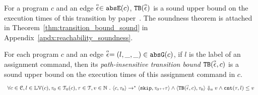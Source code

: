 \begin{enumerate}
For a program $c$ and an edge $\stackrel{\scriptscriptstyle{\alpha}}{\mathtt{\epsilon}{}} \in \mathtt{abs}{\mathtt{E}}(c)$,
${\mathtt{TB}}(\stackrel{\scriptscriptstyle{\alpha}}{\mathtt{\epsilon}{}})$ is a sound upper bound
on the execution times of this transition by paper~\cite{sinn2017complexity}.
The soundness theorem is attached in Theorem~\ref{thm:transition_bound_sound} in Appendix~\ref{apdx:reachability_soundness}.
%
\begin{thm}
  \label{thm:transition_bound_sound}
For each program ${c}$ and an edge $\stackrel{\scriptscriptstyle{\alpha}}{\mathtt{\epsilon}{}} = (l, \_, \_) \in \mathtt{abs}{\mathtt{G}}(c)$, if $l$ is the label of an assignment command,
then its \emph{path-insensitive transition bound} ${\mathtt{TB}}(\stackrel{\scriptscriptstyle{\alpha}}{\mathtt{\epsilon}{}}, c)$ 
 is a sound upper bound on 
the execution times of this assignment command in $c$.
  \[
    \begin{array}{l}
      \forall c \in \mathcal{C}, l \in \mathbb{LV}(c),\mathtt{\tau}_0 \in \mathcal{T}_0(c), 
      \mathtt{\tau} \in \mathcal{T}, v \in \mathbb{N}
       ~.~ 
       \langle {c}, \mathtt{\tau}_0 \rangle \to^{*} \langle \mathtt{skip}, \mathtt{\tau}_0{\scriptscriptstyle ++}\mathtt{\tau} \rangle 
       \land \langle {\ensuremath{\mathtt{TB}}}(\stackrel{\scriptscriptstyle{\alpha}}{\mathtt{\epsilon}{}}, c), \mathtt{\tau}_0 \rangle \Downarrow_a v
       \land
      \mathtt{cnt}(\mathtt{\tau}, l) \leq v
    \end{array}
    \]
\end{thm}
%

\end{enumerate}
